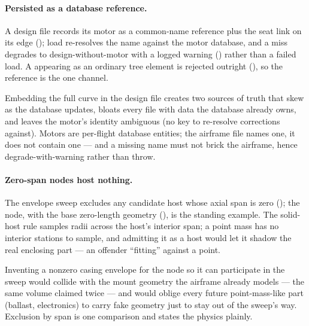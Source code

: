 \paragraph{Persisted as a database reference.}
A design file records its motor as a common-name reference plus the seat link on its edge
(); load re-resolves the name against the motor
database, and a miss degrades to design-without-motor with a logged warning
() rather than a failed load. A 
appearing as an ordinary tree  element is rejected outright
(), so the reference is the one channel.

\begin{rejected}
Embedding the full curve in the design file creates two sources of truth that skew as
the database updates, bloats every file with data the database already owns, and leaves
the motor's identity ambiguous (no key to re-resolve corrections against). Motors are
per-flight database entities; the airframe file names one, it does not contain one ---
and a missing name must not brick the airframe, hence degrade-with-warning rather than
throw.
\end{rejected}

\paragraph{Zero-span nodes host nothing.}
The envelope sweep excludes any candidate host whose axial span is zero
(); the  node, with the base
zero-length geometry (), is the standing example. The
solid-host rule samples radii across the host's interior span; a point mass has no
interior stations to sample, and admitting it as a host would let it shadow the real
enclosing part --- an offender ``fitting'' against a point.

\begin{rejected}
Inventing a nonzero casing envelope for the  node so it can participate in
the sweep would collide with the mount geometry the airframe already models --- the same
volume claimed twice --- and would oblige every future point-mass-like part (ballast,
electronics) to carry fake geometry just to stay out of the sweep's way. Exclusion by
span is one comparison and states the physics plainly.
\end{rejected}

